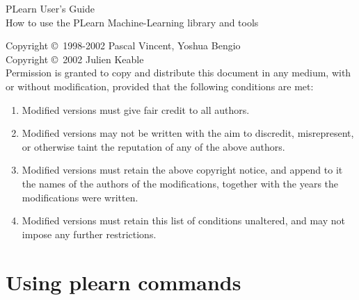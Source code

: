 \documentclass[11pt]{book}
\begin{document}
\thispagestyle{empty}

\thispagestyle{empty}
\begin{center}
{\Huge PLearn User's Guide}\\
\vspace{.5cm}
{\Large How to use the PLearn Machine-Learning library and tools}\\ 
\end{center}
\pagebreak


\vspace*{10cm}

{\small

Copyright \copyright\ 1998-2002 Pascal Vincent, Yoshua Bengio \\
Copyright \copyright\ 2002 Julien Keable \\

Permission is granted to copy and distribute this document in any medium,
with or without modification, provided that the following conditions are
met:

\begin{enumerate}
\item Modified versions must give fair credit to all authors.
\item Modified versions may not be written with the aim to discredit, misrepresent, or otherwise taint the
      reputation of any of the above authors.
\item Modified versions must retain the above copyright notice, and append to
   it the names of the authors of the modifications, together with the years the
   modifications were written.
\item Modified versions must retain this list of conditions unaltered, 
    and may not impose any further restrictions.
\end{enumerate}
}

\pagebreak

\tableofcontents

\cleardoublepage\pagebreak
{}



\chapter{Using plearn commands}
\end{document}
